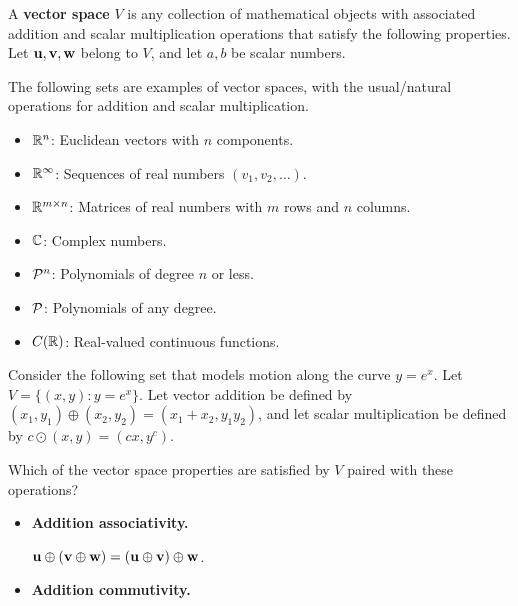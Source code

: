 \begin{applicationActivities}
\begin{definition}
  A \textbf{vector space} \(V\) is any collection of mathematical objects with
  associated addition and scalar multiplication operations that satisfy
  the following properties. Let \(\vect u,\vect v,\vect w\) belong to \(V\),
  and let \(a,b\) be scalar numbers.

  \vectorSpaceProperties
\end{definition}

\begin{remark}
  The following sets are examples of vector spaces, with the usual/natural
  operations for addition and scalar multiplication.
  \begin{itemize}
    \item \(\IR^n\): Euclidean vectors with \(n\) components.
    \item \(\IR^\infty\): Sequences of real numbers \((v_1,v_2,\dots)\).
    \item \(\IR^{m\times n}\): Matrices of real numbers with \(m\) rows and
          \(n\) columns.
    \item \(\IC\): Complex numbers.
    \item \(\P^n\): Polynomials of degree \(n\) or less.
    \item \(\P\): Polynomials of any degree.
    \item \(C(\IR)\): Real-valued continuous functions.
  \end{itemize}
\end{remark}


\begin{activity}{25}
  Consider the following set that models motion along the curve
  \(y=e^x\). Let \(V=\{(x,y):y=e^x\}\). Let vector addition be defined by
  \((x_1,y_1)\oplus (x_2,y_2)=(x_1+x_2,y_1y_2)\), and
  let scalar multiplication be defined by
  \(c\odot (x,y)=(cx,y^c)\).

  \begin{subactivity}
    Which of the vector space properties are satisfied by \(V\) paired with
    these operations?
    \begin{multicols}{2}
    \begin{itemize}
      \item \textbf{Addition associativity.}

            \(\vect u\oplus(\vect v\oplus\vect w)=
            (\vect u\oplus\vect v)\oplus\vect w\).
      \item \textbf{Addition commutivity.}


\end{itemize}
\end{multicols}
\end{subactivity}
\end{activity}
\end{applicationActivities}
